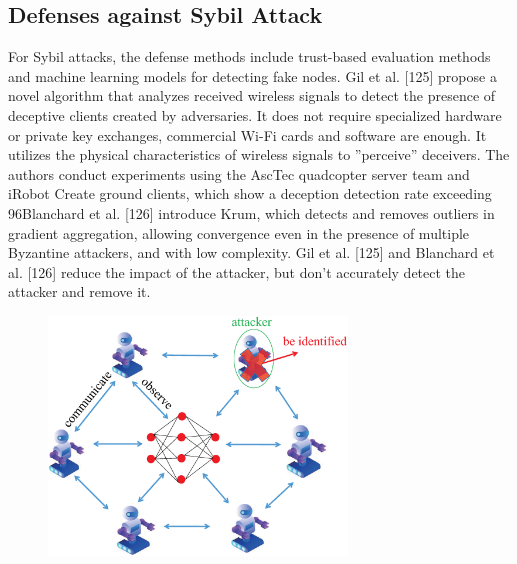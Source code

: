 \subsection{Defenses against Sybil Attack}  
For Sybil attacks, the defense methods include trust-based
evaluation methods and machine learning models
for detecting fake nodes. Gil et al. [125] propose a novel
algorithm that analyzes received wireless signals to detect
the presence of deceptive clients created by adversaries.
It does not require specialized hardware or private key
exchanges, commercial Wi-Fi cards and software are
enough. It utilizes the physical characteristics of wireless
signals to ”perceive” deceivers. The authors conduct
experiments using the AscTec quadcopter server team and
iRobot Create ground clients, which show a deception
detection rate exceeding 96Blanchard et al. [126] introduce
Krum, which detects and removes outliers in gradient
aggregation, allowing convergence even in the presence
of multiple Byzantine attackers, and with low complexity.
Gil et al. [125] and Blanchard et al. [126] reduce the impact
of the attacker, but don't accurately detect the attacker
and remove it.  

\begin{figure}[h]
    \centering
    \includegraphics[width=1.0\linewidth,height=2.5in]{output/fig17.eps}
     \caption{}
     \label{fig17}
\end{figure}


